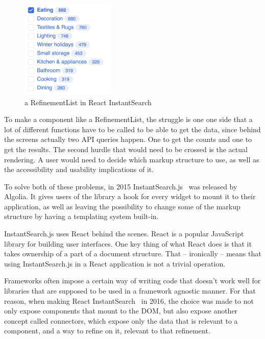 \begin{figure}[H]
  \centering
  \includegraphics[width=0.4\textwidth]{../assets/refinementlist.png}
  \caption{a RefinementList in React InstantSearch\cite{ris-storybooks}}
  \label{figure:refinementlist-ris}
\end{figure}

To make a component like a RefinementList, the struggle is one one side that a lot of different functions have to be called to be able to get the data, since behind the screens actually two API queries happen. One to get the counts and one to get the results. The second hurdle that would need to be crossed is the actual rendering. A user would need to decide which markup structure to use, as well as the accessibility and usability implications of it.

To solve both of these problems, in 2015 InstantSearch.js~\cite{instantsearch-js} was released by Algolia. It gives users of the library a hook for every widget to mount it to their application, as well as leaving the possibility to change some of the markup structure by having a templating system built-in.

InstantSearch.js uses React behind the scenes. React\cite{react-doc} is a popular JavaScript library for building user interfaces. One key thing of what React does is that it takes ownership of a part of a document structure. That -- ironically -- means that using InstantSearch.js in a React application is not a trivial operation.

Frameworks often impose a certain way of writing code that doesn't work well for libraries that are supposed to be used in a framework agnostic manner. For that reason, when making React InstantSearch~\cite{react-instantsearch} in 2016, the choice was made to not only expose components that mount to the DOM, but also expose another concept called connectors, which expose only the data that is relevant to a component, and a way to refine on it, relevant to that refinement.


